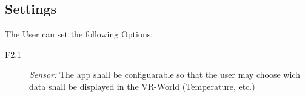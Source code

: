   \subsection{Settings}
    The User can set the following Options:

    \begin{description}
      \item[F2.1]
    	\textit{Sensor:} The app shall be configuarable so that the user may choose wich data shall be displayed in the VR-World (Temperature, etc.)
    \end{description}
